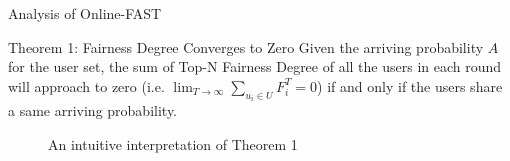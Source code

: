 \begin{frame}{Analysis of Online-FAST}
\begin{block}{Theorem 1: Fairness Degree Converges to Zero}
Given the arriving probability $A$ for the user set, the sum of Top-N Fairness Degree of all the users in each round will approach to zero (i.e.  $\lim_{T \rightarrow \infty}\sum_{u_{i} \in U} F_{i}^{T}=0$) if and only if the users share a same arriving probability.
\label{thm1}
\end{block}


\begin{figure}[H]
  \centering
  \hspace{0.1in} %
  \caption{An intuitive interpretation of Theorem 1}
\end{figure}

\end{frame}

